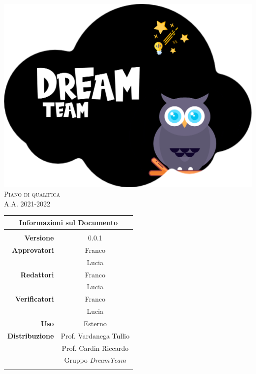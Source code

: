 \thispagestyle{empty}
\begin{titlepage}
	\begin{center}
		
		\includegraphics[scale = 0.05]{../latex/images/DreamTeam.png}\\[1.5cm]
\Huge \textsc{Piano di qualifica \doctitle{}}\\ [0.75cm]                          
\Large \textsf{A.A. 2021-2022} \\ [1cm]

\begin{table}[htbp]
\centering
\begin{tabular}{r|c}
\multicolumn{2}{c}{\textbf{Informazioni sul Documento}} \\
\hline \\
\textbf{Versione} & 0.0.1 \\ \rule{0pt}{3ex}    
\textbf{Approvatori} & Franco \\ \rule{0pt}{2ex}   
& Lucia \\ \rule{0pt}{3ex}    
\textbf{Redattori} & Franco \\ \rule{0pt}{2ex}   
& Lucia \\ \rule{0pt}{3ex}    
\textbf{Verificatori} & Franco \\ \rule{0pt}{2ex}   
& Lucia \\ \rule{0pt}{3ex}    
\textbf{Uso} & Esterno \\ \rule{0pt}{3ex}    
\textbf{Distribuzione} & Prof. Vardanega Tullio \\ \rule{0pt}{2ex}   
& Prof. Cardin Riccardo \\ \rule{0pt}{2ex}   
& Gruppo \textit{DreamTeam} \\ \rule{0pt}{0.1cm}   
\end{tabular} \\ [0.5cm]
\end{table}
  

\end{center}
\end{titlepage}
